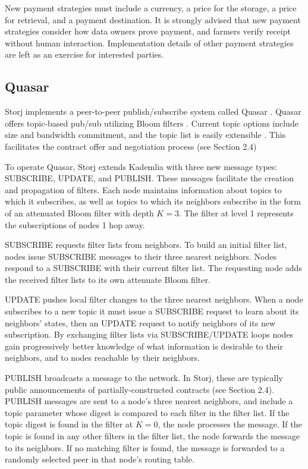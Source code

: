\documentclass[a4paper,10pt]{article}
\begin{document}
New payment strategies must include a currency, a price for the storage, a price for retrieval, and a payment destination. It is strongly advised that new payment strategies consider how data owners prove payment, and farmers verify receipt without human interaction. Implementation details of other payment strategies are left as an exercise for interested parties.

\subsection{Quasar}
Storj implements a peer-to-peer publish/subscribe system called Quasar \cite{8}\cite{9}. Quasar offers topic-based pub/sub utilizing Bloom filters \cite{10}. Current topic options include size and bandwidth commitment, and the topic list is easily extensible \cite{11}. This facilitates the contract offer and negotiation process (see Section 2.4)

To operate Quasar, Storj extends Kademlia with three new message types: SUBSCRIBE, UPDATE, and PUBLISH. These messages facilitate the creation and propagation of filters. Each node maintains information about topics to which it subscribes, as well as topics to which its neighbors subscribe in the form of an attenuated Bloom filter with depth $ K = 3 $. The filter at level 1 represents the subscriptions of nodes 1 hop away.

SUBSCRIBE requests filter lists from neighbors. To build an initial filter list, nodes issue SUBSCRIBE messages to their three nearest neighbors. Nodes respond to a SUBSCRIBE with their current filter list. The requesting node adds the received filter lists to its own attenuate Bloom filter.

UPDATE pushes local filter changes to the three nearest neighbors. When a node subscribes to a new topic it must issue a SUBSCRIBE request to learn about its neighbors’ states, then an UPDATE request to notify neighbors of its new subscription. By exchanging filter lists via SUBSCRIBE/UPDATE loops nodes gain progressively better knowledge of what information is desirable to their neighbors, and to nodes reachable by their neighbors.

PUBLISH broadcasts a message to the network. In Storj, these are typically public announcements of partially-constructed contracts (see Section 2.4). PUBLISH messages are sent to a node’s three nearest neighbors, and include a topic parameter whose digest is compared to each filter in the filter list. If the topic digest is found in the filter at $ K = 0 $, the node processes the message. If the topic is found in any other filters in the filter list, the node forwards the message to its neighbors. If no matching filter is found, the message is forwarded to a randomly selected peer in that node’s routing table.
\end{document}
